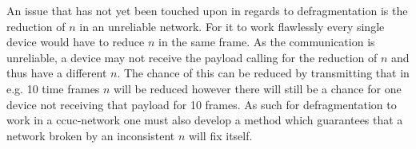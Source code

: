 \bigskip \noindent
An issue that has not yet been touched upon in regards to defragmentation is the reduction of $n$ in an unreliable network.
For it to work flawlessly every single device would have to reduce $n$ in the same frame.
As the communication is unreliable, a device may not receive the payload calling for the reduction of $n$ and thus have a different $n$.
The chance of this can be reduced by transmitting that in e.g. 10 time frames $n$ will be reduced however there will still be a chance for one device not receiving that payload for 10 frames.
As such for defragmentation to work in a \gls{ccuc}-network one must also develop a method which guarantees that a network broken by an inconsistent $n$ will fix itself.